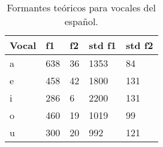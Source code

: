 \begin{table}[H]
\centering
\caption{Formantes teóricos para vocales del español.}
\label{tab:formantes_teoricos}
\begin{tabular}{|l|l|l|l|l|}
\hline
\textbf{Vocal} & \textbf{f1} & \textbf{f2} & \textbf{std f1} & \textbf{std f2} \\ \hline
a   & 638 & 36 & 1353 & 84 \\ \hline
e   & 458 & 42 & 1800 & 131 \\ \hline
i   & 286 & 6  & 2200 & 131 \\ \hline
o   & 460 & 19 & 1019 & 99 \\ \hline
u   & 300 & 20 & 992  & 121 \\ \hline

\end{tabular}
\end{table}